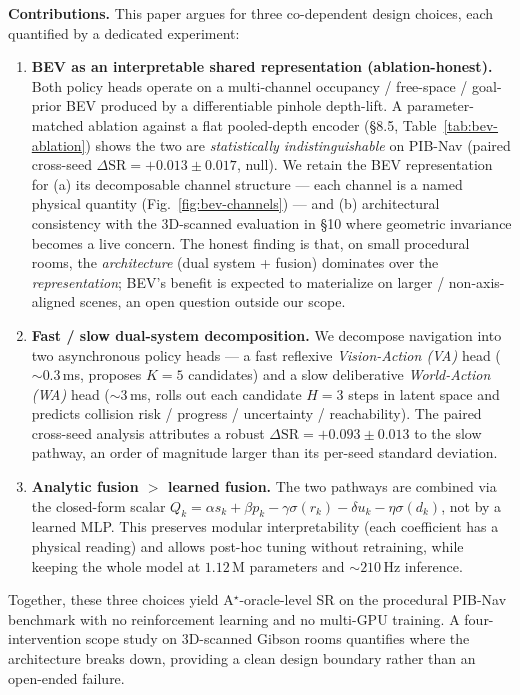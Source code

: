 \documentclass[11pt,a4paper]{article}
\newcommand{\en}[1]{\par\noindent #1\par\vspace{0.15em}}
\begin{document}
\en{\textbf{Contributions.} This paper argues for three co-dependent design
choices, each quantified by a dedicated experiment:
\begin{enumerate}[leftmargin=*, itemsep=3pt]
\item \textbf{BEV as an interpretable shared representation
(ablation-honest).} Both policy heads operate on a multi-channel
occupancy / free-space / goal-prior BEV produced by a differentiable
pinhole depth-lift. A parameter-matched ablation against a flat
pooled-depth encoder (§8.5, Table~\ref{tab:bev-ablation}) shows the
two are \emph{statistically indistinguishable} on PIB-Nav
(paired cross-seed $\Delta\mathrm{SR} = +0.013 \pm 0.017$, null).
We retain the BEV representation for (a) its decomposable channel
structure — each channel is a named physical quantity
(Fig.~\ref{fig:bev-channels}) — and (b) architectural consistency
with the 3D-scanned evaluation in §10 where geometric invariance
becomes a live concern. The honest finding is that, on small
procedural rooms, the \emph{architecture} (dual system + fusion)
dominates over the \emph{representation}; BEV's benefit is expected
to materialize on larger / non-axis-aligned scenes, an open question
outside our scope.
\item \textbf{Fast / slow dual-system decomposition.} We decompose
navigation into two asynchronous policy heads — a fast reflexive
\emph{Vision-Action (VA)} head ($\sim 0.3$\,ms, proposes $K{=}5$
candidates) and a slow deliberative \emph{World-Action (WA)} head
($\sim 3$\,ms, rolls out each candidate $H{=}3$ steps in latent space
and predicts collision risk / progress / uncertainty / reachability).
The paired cross-seed analysis attributes a robust
$\Delta \mathrm{SR} = +0.093 \pm 0.013$ to the slow pathway, an order
of magnitude larger than its per-seed standard deviation.
\item \textbf{Analytic fusion $>$ learned fusion.} The two pathways are
combined via the closed-form scalar
$Q_k = \alpha s_k + \beta p_k - \gamma\sigma(r_k) - \delta u_k -
\eta\sigma(d_k)$, not by a learned MLP. This preserves modular
interpretability (each coefficient has a physical reading) and allows
post-hoc tuning without retraining, while keeping the whole model at
$1.12$\,M parameters and $\sim 210$\,Hz inference.
\end{enumerate}
Together, these three choices yield A$^\star$-oracle-level SR on the
procedural PIB-Nav benchmark with no reinforcement learning and no
multi-GPU training. A four-intervention scope study on 3D-scanned
Gibson rooms quantifies where the architecture breaks down, providing
a clean design boundary rather than an open-ended failure.}
\end{document}
